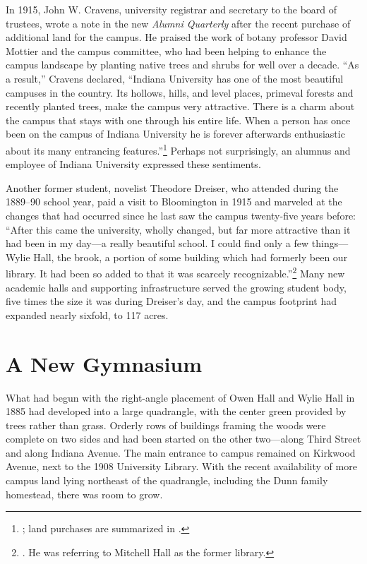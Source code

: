 \documentclass[
  american,
  letterpaper,
]{scrreprt}
\begin{document}
In 1915, John W. Cravens, university registrar and secretary to the
board of trustees, wrote a note in the new \emph{Alumni Quarterly} after
the recent purchase of additional land for the campus. He praised the
work of botany professor David Mottier and the campus committee, who had
been helping to enhance the campus landscape by planting native trees
and shrubs for well over a decade. ``As a result,'' Cravens declared,
``Indiana University has one of the most beautiful campuses in the
country. Its hollows, hills, and level places, primeval forests and
recently planted trees, make the campus very attractive. There is a
charm about the campus that stays with one through his entire life. When
a person has once been on the campus of Indiana University he is forever
afterwards enthusiastic about its many entrancing features.''\footnote{; land purchases are summarized in
  .} Perhaps not surprisingly, an alumnus and employee of
Indiana University expressed these sentiments.

Another former student, novelist Theodore Dreiser, who attended during
the 1889--90 school year, paid a visit to Bloomington in 1915 and
marveled at the changes that had occurred since he last saw the campus
twenty-five years before: ``After this came the university, wholly
changed, but far more attractive than it had been in my day---a really
beautiful school. I could find only a few things---Wylie Hall, the
brook, a portion of some building which had formerly been our library.
It had been so added to that it was scarcely recognizable.''\footnote{. He was referring to Mitchell Hall as the
  former library.} Many new academic halls and supporting infrastructure
served the growing student body, five times the size it was during
Dreiser's day, and the campus footprint had expanded nearly sixfold, to
117 acres.

\section{A New Gymnasium}\label{a-new-gymnasium}

What had begun with the right-angle placement of Owen Hall and Wylie
Hall in 1885 had developed into a large quadrangle, with the center
green provided by trees rather than grass. Orderly rows of buildings
framing the woods were complete on two sides and had been started on the
other two---along Third Street and along Indiana Avenue. The main
entrance to campus remained on Kirkwood Avenue, next to the 1908
University Library. With the recent availability of more campus land
lying northeast of the quadrangle, including the Dunn family homestead,
there was room to grow.
\end{document}
